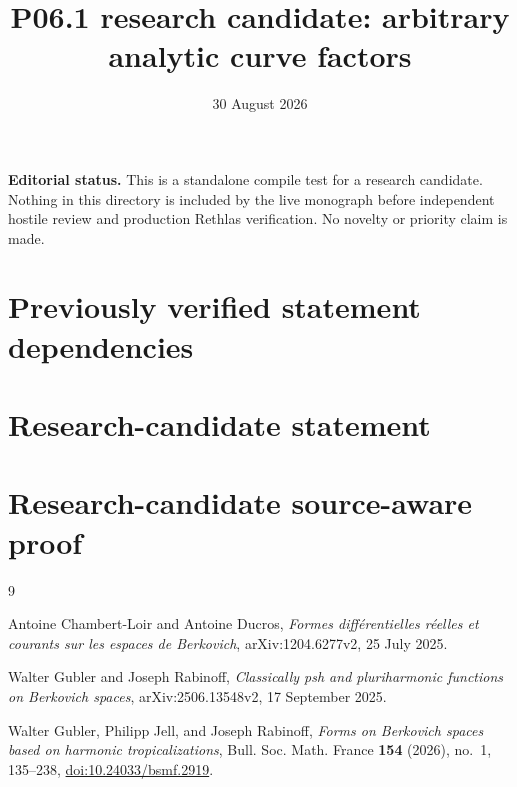 \documentclass[11pt]{article}
\title{P06.1 research candidate: arbitrary analytic curve factors}
\author{}
\date{30 August 2026}
\begin{document}
\maketitle

\noindent
\textbf{Editorial status.}
This is a standalone compile test for a research candidate. Nothing in this
directory is included by the live monograph before independent hostile
review and production Rethlas verification. No novelty or priority claim is
made.

\section*{Previously verified statement dependencies}




\section*{Research-candidate statement}



\section*{Research-candidate source-aware proof}



\begin{thebibliography}{9}

Antoine Chambert-Loir and Antoine Ducros,
\emph{Formes diff\'erentielles r\'eelles et courants sur les espaces de
Berkovich}, arXiv:1204.6277v2, 25 July 2025.

Walter Gubler and Joseph Rabinoff,
\emph{Classically psh and pluriharmonic functions on Berkovich spaces},
arXiv:2506.13548v2, 17 September 2025.

Walter Gubler, Philipp Jell, and Joseph Rabinoff,
\emph{Forms on Berkovich spaces based on harmonic tropicalizations},
Bull. Soc. Math. France \textbf{154} (2026), no.~1, 135--238,
\href{https://doi.org/10.24033/bsmf.2919}{doi:10.24033/bsmf.2919}.

\end{thebibliography}
\end{document}
